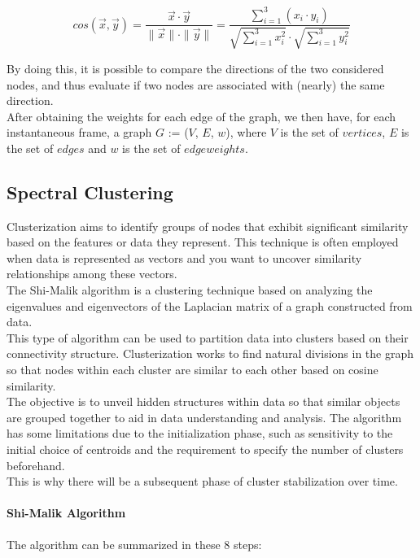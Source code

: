 \begin{equation}  
  cos(\vec{x}, \vec{y}) = \frac{\vec{x} \cdot \vec{y}}{\|\vec{x}\| \cdot \|\vec{y}\|}  =  \frac{\sum_{i=1}^{3} (x_i \cdot y_i)}{\sqrt{\sum_{i=1}^{3} x_i^2} \cdot \sqrt{\sum_{i=1}^{3} y_i^2}}    
\end{equation} 

By doing this, it is possible to compare the directions of the two considered nodes, and thus evaluate if two nodes are associated with (nearly) the same direction. \\ 
After obtaining the weights for each edge of the graph, we then have, for each instantaneous frame, a graph $G$ := ($V$, $E$, $w$), where   
$V$ is the set of $vertices$, $E$ is the set of $edges$ and $w$ is the set of $edge weights$.


\subsection{Spectral Clustering}
Clusterization aims to identify groups of nodes that exhibit significant similarity based on the features or data they represent.
This technique is often employed when data is represented as vectors and you want to uncover similarity relationships among these vectors.\\
The Shi-Malik algorithm is a clustering technique based on analyzing the eigenvalues and eigenvectors of the Laplacian matrix of a graph constructed from data.\\
This type of algorithm can be used to partition data into clusters based on their connectivity structure.
Clusterization works to find natural divisions in the graph so that nodes within each cluster are similar to each other based on cosine similarity. \\
The objective is to unveil hidden structures within data so that similar objects are grouped together to aid in data understanding and analysis.
The algorithm has some limitations due to the initialization phase, such as sensitivity to the initial choice of centroids and the requirement to specify the number of clusters beforehand.\\
This is why there will be a subsequent phase of cluster stabilization over time.

\paragraph{Shi-Malik Algorithm} The algorithm can be summarized in these 8 steps:

